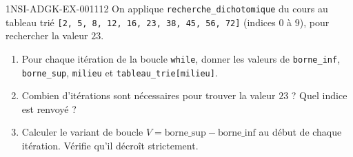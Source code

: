 \begin{exercice}{1NSI-ADGK-EX-001}{1}{12}
On applique \lstinline{recherche_dichotomique} du cours au tableau trié
\lstinline{[2, 5, 8, 12, 16, 23, 38, 45, 56, 72]} (indices $0$ à $9$), pour rechercher la
valeur $23$.
\begin{enumerate}
  \item Pour chaque itération de la boucle \lstinline{while}, donner les valeurs de \lstinline{borne_inf}, \lstinline{borne_sup}, \lstinline{milieu} et \lstinline{tableau_trie[milieu]}.
  \item Combien d'itérations sont nécessaires pour trouver la valeur $23$ ? Quel indice est renvoyé ?
  \item Calculer le variant de boucle $V=\text{borne\_sup}-\text{borne\_inf}$ au début de chaque itération. Vérifie qu'il décroît strictement.
\end{enumerate}
\end{exercice}
